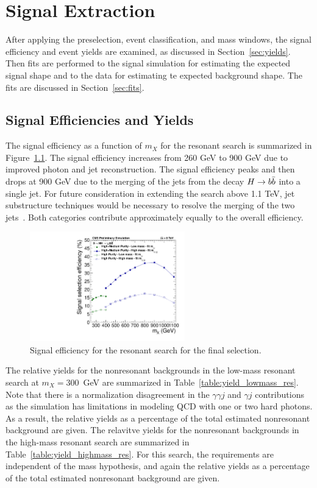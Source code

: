 \chapter{Signal Extraction\label{ch:signalextraction}}

After applying the preselection, event classification, and mass windows, the signal efficiency
and event yields are examined, as discussed in Section~\ref{sec:yields}. Then fits are performed
to the signal simulation for estimating the expected signal shape and to the data for estimating
te expected background shape. The fits are discussed in Section~\ref{sec:fits}.

\section{Signal Efficiencies and Yields\label{sec:yields}}

The signal efficiency as a function of $m_X$ for the resonant search is summarized in
Figure~\ref{fig:eff_res}. The signal efficiency increases from 260 GeV to 900 GeV
due to improved photon and jet reconstruction. The signal efficiency
peaks and then drops at 900 GeV due to the merging of the jets from the decay $H\to b\bar{b}$ into
a single jet. For future consideration in extending the search above 1.1 TeV,
jet substructure techniques would be necessary to resolve the merging of the two
jets~\cite{Ellis:2009su}.
Both categories contribute approximately equally to the overall efficiency.

\begin{figure}[htbp!]
 \begin{center}
    \includegraphics[width=0.60\textwidth]{figures/results/eff_all.pdf}
      \end{center}
\caption{Signal efficiency for the resonant search for the final selection.}
\label{fig:eff_res}
\end{figure}

The relative yields for the nonresonant backgrounds in the low-mass resonant search at $m_X = 300$~GeV
are summarized in
Table~\ref{table:yield_lowmass_res}. Note that there is a normalization disagreement in the
$\gamma\gamma j$ and $\gamma j$ contributions as the simulation has limitations in modeling
QCD with one or two hard photons. As a result, the relative yields as a percentage of the total estimated
nonresonant background are given.
The relavitve yields for the nonresonant backgrounds in the high-mass resonant search are summarized in
Table~\ref{table:yield_highmass_res}. For this search, the requirements are independent of
the mass hypothesis, and again the relative yields as a percentage of the total estimated nonresonant
background are given.

